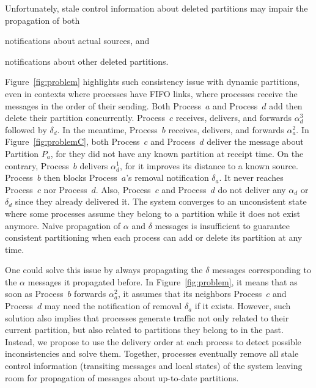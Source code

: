 

Unfortunately, stale control information about deleted partitions may
impair the propagation of both
\begin{inparaenum}[(i)]
\item notifications about actual sources, and
\item notifications about other deleted partitions.
\end{inparaenum}
Figure~\ref{fig:problem} highlights such consistency issue with
dynamic partitions, even in contexts where processes have FIFO links,
\ie where processes receive the messages in the order of their
sending. Both Process~$a$ and Process~$d$ add then delete their
partition concurrently. Process~$c$ receives, delivers, and forwards
$\alpha_d^3$ followed by $\delta_d$. In the meantime, Process~$b$
receives, delivers, and forwards $\alpha_a^2$. In
Figure~\ref{fig:problemC}, both Process~$c$ and Process~$d$ deliver
the message about Partition $P_a$, for they did not have any known
partition at receipt time. On the contrary, Process~$b$ delivers
$\alpha_d^1$, for it improves its distance to a known
source. Process~$b$ then blocks Process~$a$'s removal notification
$\delta_a$. It never reaches Process~$c$ nor Process~$d$. Also,
Process~$c$ and Process~$d$ do not deliver any $\alpha_d$ or
$\delta_d$ since they already delivered it. The system converges to an
unconsistent state where some processes assume they belong to a
partition while it does not exist anymore. Naive propagation of
$\alpha$ and $\delta$ messages is insufficient to guarantee consistent
partitioning when each process can add or delete its partition at any
time.

One could solve this issue by always propagating the $\delta$ messages
corresponding to the $\alpha$ messages it propagated before. In
Figure~\ref{fig:problem}, it means that as soon as Process~$b$
forwards $\alpha_a^2$, it assumes that its neighbors Process~$c$ and
Process~$d$ may need the notification of removal $\delta_a$ if it
exists. However, such solution also implies that processes generate
traffic not only related to their current partition, but also related
to partitions they belong to in the past. Instead, we propose to use
the delivery order at each process to detect possible inconsistencies
and solve them. Together, processes eventually remove all stale
control information (transiting messages and local states) of the
system leaving room for propagation of messages about up-to-date
partitions.

